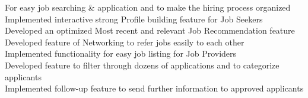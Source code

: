 \documentclass[]{jaydeep-resume-openfont}
\begin{document}
\begin{minipage}[t]{0.70\textwidth}
\textbullet{} For easy job searching \& application and to make the hiring process organized\\
\textbullet{} Implemented interactive strong Profile building feature for Job Seekers\\
\textbullet{} Developed an optimized Most recent and relevant Job Recommendation feature\\
\textbullet{} Developed feature of Networking to refer jobs easily to each other\\
\textbullet{} Implemented functionality for easy job listing for Job Providers\\
\textbullet{} Developed feature to filter through dozens of applications and to categorize applicants\\
\textbullet{} Implemented follow-up feature to send further information to approved applicants\\
\sectionsep




\end{minipage}
\end{document}
